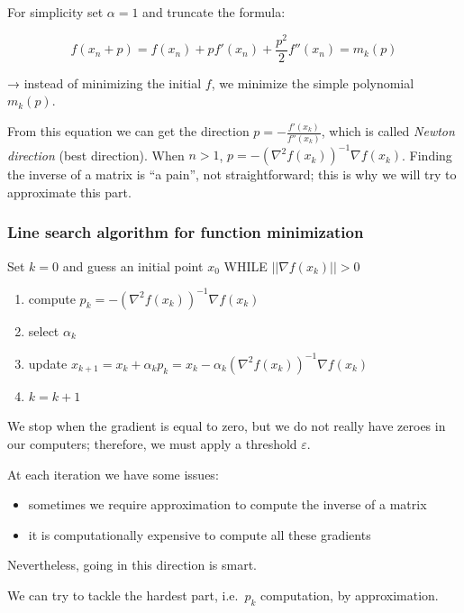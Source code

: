 For simplicity set $\alpha=1$ and truncate the formula:

$$
f(x_n+p)=f(x_n) + p f'(x_n) + \frac{p^2}{2} f''(x_n) = m_k(p)
$$

→ instead of minimizing the initial $f$, we minimize the simple
polynomial $m_k(p)$.

From this equation we can get the direction
$p = -\frac{f'(x_k)}{f''(x_k)}$, which is called \emph{Newton direction}
(best direction). When $n>1$,
$p = -(\nabla^2 f(x_k))^{-1}\nabla f(x_k)$. Finding the inverse of a
matrix is ``a pain'', not straightforward; this is why we will try to
approximate this part.

\hypertarget{line-search-algorithm-for-function-minimization}{%
\subsubsection{Line search algorithm for function
minimization}\label{line-search-algorithm-for-function-minimization}}

Set $k=0$ and guess an initial point $x_0$ WHILE $||\nabla f(x_k)||>0$

\begin{enumerate}
\def\labelenumi{\arabic{enumi}.}
\tightlist
\item
  compute $p_k=-(\nabla^2f(x_k))^{-1}\nabla f(x_k)$
\item
  select $\alpha_k$
\item
  update
  $x_{k+1}=x_k+\alpha_kp_k = x_k -\alpha_k(\nabla^2f(x_k))^{-1}\nabla f(x_k)$
\item
  $k=k+1$
\end{enumerate}

We stop when the gradient is equal to zero, but we do not really have
zeroes in our computers; therefore, we must apply a threshold
$\varepsilon$.

At each iteration we have some issues:

\begin{itemize}
\tightlist
\item
  sometimes we require approximation to compute the inverse of a matrix
\item
  it is computationally expensive to compute all these gradients
\end{itemize}

Nevertheless, going in this direction is smart.

We can try to tackle the hardest part, i.e.~$p_k$ computation, by
approximation.

